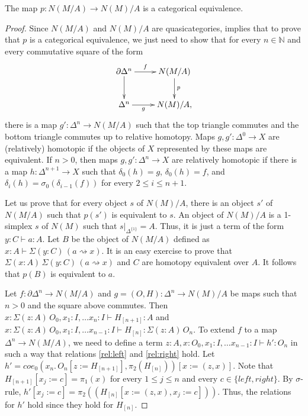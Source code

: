 \documentclass[reqno]{amsart}
\theoremstyle{definition}
\theoremstyle{remark}
\newcommand{\repl}{:=}
\newcommand{\idtype}{\rightsquigarrow}
\numberwithin{figure}{section}
\begin{document}
\begin{prop}
The map $p : N(M/A) \to N(M)/A$ is a categorical equivalence.
\end{prop}
\begin{proof}
Since $N(M/A)$ and $N(M)/A$ are quasicategories, \cite[Proposition~3.5]{f-model-structures} implies that to prove that $p$ is a categorical equivalence,
we just need to show that for every $n \in \mathbb{N}$ and every commutative square of the form
\[ \xymatrix{ \partial \Delta^n \ar[r]^-f \ar[d] & N(M/A) \ar[d]^p \\
              \Delta^n \ar[r]_-g                 & N(M)/A,
            } \]
there is a map $g' : \Delta^n \to N(M/A)$ such that the top triangle commutes and the bottom triangle commutes up to relative homotopy.
Maps $g,g' : \Delta^0 \to X$ are (relatively) homotopic if the objects of $X$ represented by these maps are equivalent.
If $n > 0$, then maps $g,g' : \Delta^n \to X$ are relatively homotopic if there is a map $h : \Delta^{n+1} \to X$
such that $\delta_0(h) = g$, $\delta_0(h) = f$, and $\delta_i(h) = \sigma_0(\delta_{i-1}(f))$ for every $2 \leq i \leq n+1$.

Let us prove that for every object $s$ of $N(M)/A$, there is an object $s'$ of $N(M/A)$ such that $p(s')$ is equivalent to $s$.
An object of $N(M)/A$ is a 1-simplex $s$ of $N(M)$ such that $s|_{\Delta^{\{1\}}} = A$.
Thus, it is just a term of the form $y : C \vdash a : A$.
Let $B$ be the object of $N(M/A)$ defined as $x : A \vdash \Sigma (y : C)\,(a \idtype x)$.
It is an easy exercise to prove that $\Sigma (x : A)\,\Sigma (y : C)\,(a \idtype x)$ and $C$ are homotopy equivalent over $A$.
It follows that $p(B)$ is equivalent to $a$.

Let $f : \partial \Delta^n \to N(M/A)$ and $g = (O,H) : \Delta^n \to N(M)/A$ be maps such that $n > 0$ and the square above commutes.
Then $x : \Sigma (z : A)\,O_0, x_1 : I, \ldots x_n : I \vdash H_{[n+1]} : A$ and
$x : \Sigma (z : A)\,O_0, x_1 : I, \ldots x_{n-1} : I \vdash H_{[n]} : \Sigma (z : A)\,O_n$.
To extend $f$ to a map $\Delta^n \to N(M/A)$, we need to define a term $z : A, x : O_0, x_1 : I, \ldots x_{n-1} : I \vdash h' : O_n$
in such a way that relations \eqref{rel:left} and \eqref{rel:right} hold.
Let $h' = coe_0(x_n.\,O_n[z \repl H_{[n+1]}], \pi_2(H_{[n]}))[x \repl (z,x)]$.
Note that $H_{[n+1]}[x_j \repl c] = \pi_1(x)$ for every $1 \leq j \leq n$ and every $c \in \{ left, right \}$.
By $\sigma$-rule, $h'[x_j \repl c] = \pi_2((H_{[n]}[x \repl (z,x), x_j \repl c]))$.
Thus, the relations for $h'$ hold since they hold for $H_{[n]}$.


\end{proof}
\end{document}
